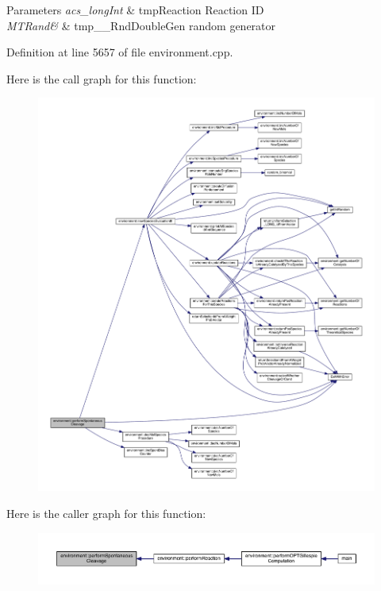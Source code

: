 \begin{DoxyParams}{Parameters}
{\em acs\-\_\-long\-Int} & tmp\-Reaction Reaction I\-D \\
\hline
{\em M\-T\-Rand\&} & tmp\-\_\-\-\_\-\-Rnd\-Double\-Gen random generator \\
\hline
\end{DoxyParams}


Definition at line 5657 of file environment.\-cpp.



Here is the call graph for this function\-:\nopagebreak
\begin{figure}[H]
\begin{center}
\leavevmode
\includegraphics[width=350pt]{a00014_a4949138a3771b7f6ec2bfe82cbad947e_cgraph}
\end{center}
\end{figure}




Here is the caller graph for this function\-:\nopagebreak
\begin{figure}[H]
\begin{center}
\leavevmode
\includegraphics[width=350pt]{a00014_a4949138a3771b7f6ec2bfe82cbad947e_icgraph}
\end{center}
\end{figure}


